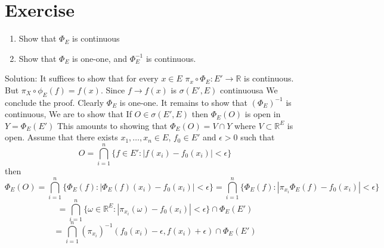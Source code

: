 \documentclass[11pt]{article}
\begin{document}
\section{Exercise}
\begin{enumerate}
    \item Show that $\Phi_E$ is continuous
    \item Show that $\Phi_E$ is one-one, and $\Phi_E^{-1}$ is continuous.
\end{enumerate}
Solution: It suffices to show that for every $x \in E$ $\pi_x \circ \Phi_E : E' \rightarrow \mathbb{R}$ is continuous.
But $\pi_X \circ \phi_E(f) = f(x)$. Since $f \rightarrow f(x)$  is $\sigma(E',E)$ continuousa We conclude the proof.
Clearly $\Phi_E$ is one-one. It remains to show that $(\Phi_E)^{-1}$ is continuous, We are to show that If $O \in \sigma(E',E)$ then
$\Phi_E(O)$ is open  in  $Y = \Phi_E(E')$ This amounts to showing that  $\Phi_E(O) = V \cap Y$ where  $V \subset \mathbb{R}^{E}$ is open.
Assume that there exists $x_1,\dots,x_n \in E$, $f_0 \in E'$ and $\epsilon > 0$ such that
\[
    O = \bigcap_{i=1}^{n}\{f \in E': |f(x_i) - f_0(x_i)| < \epsilon\}
\] 
then
\[
    \Phi_E(O) = \bigcap_{i=1}^{n}\{\Phi_E(f) : |\Phi_E(f)(x_i) - f_0(x_i)| < \epsilon\} = \bigcap_{i=1}^{n}\{\Phi_E(f) : |\pi_{x_i}\Phi_E(f) - f_0(x_i)| < \epsilon\}
\] 
\[
    = \bigcap_{i=1}^{n}\{ \omega \in \mathbb{R}^{E} : |\pi_{x_i}(\omega) - f_0(x_i)| < \epsilon\} \cap \Phi_E(E')
\] 
\[
    = \bigcap_{i=1}^{n} (\pi_{x_i})^{-1}(f_0(x_i) - \epsilon, f(x_i) + \epsilon) \cap \Phi_E(E')
\] 
\end{document}
